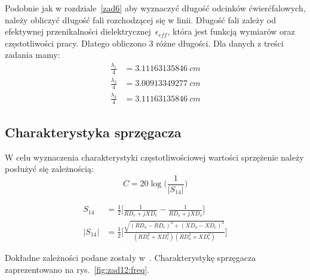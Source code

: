 \documentclass[rep.tex]{subfiles}
\begin{document}
Podobnie jak w rozdziale~\ref{zad6} aby wyznaczyć długość odcinków ćwierćfalowych, należy obliczyć długość fali rozchodzącej się w linii.
Długość fali zależy od efektywnej przenikalności dielektrycznej~$\epsilon_{eff}$, która jest funkcją wymiarów oraz częstotliwości pracy.
Dlatego obliczono 3 różne długości.
Dla danych z treści zadania mamy:
\begin{align}
  \frac{\lambda_1}{4} &= 3.11163135846~cm \nonumber \\
  \frac{\lambda_2}{4} &= 3.00913349277~cm \nonumber \\
  \frac{\lambda_3}{4} &= 3.11163135846~cm \nonumber 
\end{align}

\subsection{Charakterystyka sprzęgacza}
W celu wyznaczenia charakterystyki częstotliwościowej wartości sprzężenie należy posłużyć się zależnością:
\begin{equation}
  C = 20 \log\Big(\frac{1}{|S_{14}|}\Big) \label{eqn:zad12:C}
\end{equation}

\begin{align}
  S_{14} &= \frac{1}{2} \bigg[ \frac{1}{RD_e + jXD_e} - \frac{1}{RD_o + jXD_o}\bigg] \\
  |S_{14}| &= \frac{1}{2} \bigg[\frac{\sqrt{(RD_o - RD_e)^2 + (XD_o - XD_e)^2}}{(RD_e^2 + XD_e^2)(RD_o^2 + XD_e^2)} \bigg]
\end{align}

Dokładne zależności podane zostały w~\cite{obwody}.
Charakterystykę sprzęgacza zaprezentowano na rys.~\ref{fig:zad12:freq}.
\end{document}
